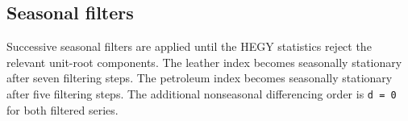 \documentclass[
  11pt,
]{article}
\newenvironment{Shaded}{\begin{snugshade}}{\end{snugshade}}
\newcommand{\AttributeTok}[1]{\textcolor[rgb]{0.13,0.29,0.53}{#1}}
\newcommand{\DecValTok}[1]{\textcolor[rgb]{0.00,0.00,0.81}{#1}}
\newcommand{\FunctionTok}[1]{\textcolor[rgb]{0.13,0.29,0.53}{\textbf{#1}}}
\newcommand{\NormalTok}[1]{#1}
\newcommand{\OtherTok}[1]{\textcolor[rgb]{0.56,0.35,0.01}{#1}}
\newcommand{\SpecialCharTok}[1]{\textcolor[rgb]{0.81,0.36,0.00}{\textbf{#1}}}
\newcommand{\StringTok}[1]{\textcolor[rgb]{0.31,0.60,0.02}{#1}}
\begin{document}
\begin{Shaded}
\end{Shaded}

\subsection{Seasonal filters}\label{seasonal-filters}

Successive seasonal filters are applied until the HEGY statistics reject
the relevant unit-root components. The leather index becomes seasonally
stationary after seven filtering steps. The petroleum index becomes
seasonally stationary after five filtering steps. The additional
nonseasonal differencing order is \texttt{d\ =\ 0} for both filtered
series.
\end{document}
